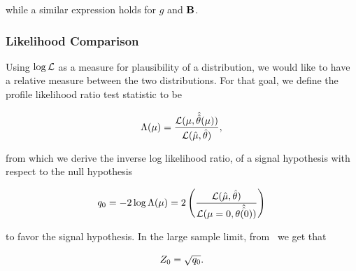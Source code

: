 \documentclass[../../ddppaper2.tex]{subfiles}
\begin{document}
\noindent while a similar expression holds for $g$ and ${\mathbf{B}}$.

\subsubsection{Likelihood Comparison}

Using $\log\mathcal{L}$ as a measure for plausibility of a distribution, we would like to have a relative measure between the two distributions. For that goal, we define the profile likelihood ratio test statistic to be

\begin{equation}
\label{eq:profile_likelihood_ratio}
\plratio = \dfrac{\likelihood(\param, \hat{\hat{\nparam}}(\param))}{\likelihood(\hat{\param}, \hat{\nparam})},
\end{equation}

\noindent from which we derive the inverse log likelihood ratio, of a signal hypothesis with respect to the null hypothesis

\begin{equation}
\label{eq:inverse_log_likelihood_ratio}
    \invllratio = - 2 \log \plratio = 2 \left( \dfrac{\likelihood(\hat{\param}, \hat{\nparam})}{\likelihood(\param = 0, \hat{\hat{\nparam(0)}})} \right)
\end{equation}

\noindent to favor the signal hypothesis. In the large sample limit, from~\cite{Cowan_and_Eilam_PL_formulation} we get that

\begin{equation}
    Z_0 = \sqrt{{q_{0}}}. 
\end{equation}
\end{document}
